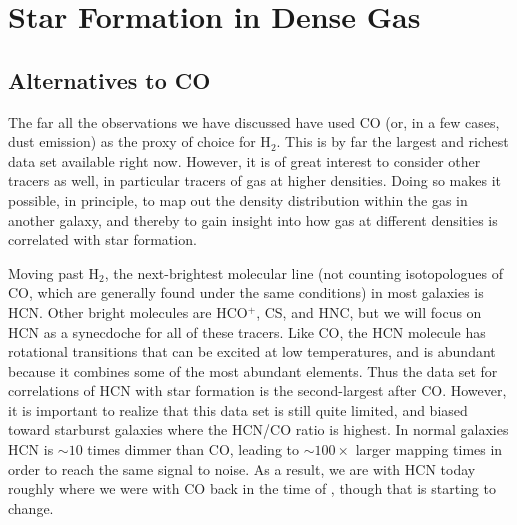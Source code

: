 \section{Star Formation in Dense Gas}

\subsection{Alternatives to CO}

The far all the observations we have discussed have used CO (or, in a few cases, dust emission) as the proxy of choice for H$_2$. This is by far the largest and richest data set available right now. However, it is of great interest to consider other tracers as well, in particular tracers of gas at higher densities. Doing so makes it possible, in principle, to map out the density distribution within the gas in another galaxy, and thereby to gain insight into how gas at different densities is correlated with star formation.

Moving past H$_2$, the next-brightest molecular line (not counting isotopologues of CO, which are generally found under the same conditions) in most galaxies is HCN. Other bright molecules are HCO$^+$, CS, and HNC, but we will focus on HCN as a synecdoche for all of these tracers. Like CO, the HCN molecule has rotational transitions that can be excited at low temperatures, and is abundant because it combines some of the most abundant elements. Thus the data set for correlations of HCN with star formation is the second-largest after CO. However, it is important to realize that this data set is still quite limited, and biased toward starburst galaxies where the HCN/CO ratio is highest. In normal galaxies HCN is $\sim 10$ times dimmer than CO, leading to $\sim 100\times$ larger mapping times in order to reach the same signal to noise. As a result, we are with HCN today roughly where we were with CO back in the time of \citet{kennicutt98a}, though that is starting to change.

